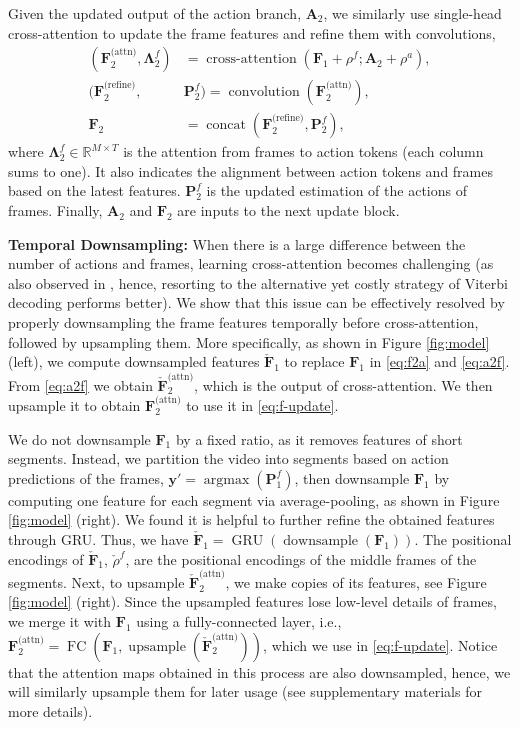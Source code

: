 \documentclass[10pt,twocolumn,letterpaper]{article}
\newcommand{\headline}[1]{\noindent \textbf{#1}}
\newcommand{\A}{\mathbf{A}}
\newcommand{\F}{\mathbf{F}}
\newcommand{\dF}{\check{\mathbf{F}}}
\newcommand{\Prob}{\mathbf{P}}
\newcommand{\y}{\boldsymbol{y}}
\newcommand{\attn}{\text{(attn)}}
\newcommand{\refine}{\text{(refine)}}
\renewcommand{\Re}{\mathbb{R}}
\newcommand{\0}{\boldsymbol{0}}
\newcommand{\conv}{\operatorname{convolution}}
\newcommand{\conc}{\operatorname{concat}}
\newcommand{\catt}{\operatorname{cross-attention}}
\newcommand{\amax}{\operatorname{argmax}}
\newcommand{\dsample}{\operatorname{downsample}}
\newcommand{\usample}{\operatorname{upsample}}
\newcommand{\gru}{\operatorname{GRU}}
\newcommand{\fc}{\operatorname{FC}}
\begin{document}
Given the updated output of the action branch, $\A_2$, we similarly use single-head cross-attention to update the frame features and refine them with convolutions, 
\begin{align}
(\F^\attn_2, \mathbf{\Lambda}^f_2) &= \catt(\F_1 + \rho^f; \A_2 + \rho^a), \label{eq:a2f} \\
(\F^\refine_2, & \Prob^f_2)  = \conv(\F^\attn_2), \\
\F_2 & =  \conc(\F^\refine_2, \Prob^f_2), \label{eq:f-update}
\end{align}
where $\mathbf{\Lambda}^f_2 \in \Re^{M \times T}$ is the attention from frames to action tokens (each column sums to one). It also indicates the alignment between action tokens and frames based on the latest features. 
$\Prob^f_2$ is the updated estimation of the actions of frames. 
Finally, $\A_2$ and $\F_2$ are inputs to the next update block.

\headline{Temporal Downsampling: } 
When there is a large difference between the number of actions and frames, learning cross-attention becomes challenging (as also observed in \cite{Behrmann:ECCV22}, hence, resorting to the alternative yet costly strategy of Viterbi decoding performs better). 
We show that this issue can be effectively resolved by properly downsampling the frame features temporally before cross-attention, followed by upsampling them. More specifically, as shown in Figure \ref{fig:model} (left), we compute downsampled features $\check{\F}_1$ to replace $\F_1$ in \eqref{eq:f2a} and \eqref{eq:a2f}.  
From \eqref{eq:a2f} we obtain $\dF^\attn_{2}$, which is the output of cross-attention. We then upsample it to obtain $\F^\attn_2$ to use it in \eqref{eq:f-update}.

We do not downsample $\F_1$ by a fixed ratio, as it removes features of short segments.
Instead, we partition the video into segments based on action predictions of the frames, $\y' = \amax(\Prob^f_1)$, then downsample $\F_1$ by computing one feature for each segment via average-pooling, as shown in Figure \ref{fig:model} (right).
We found it is helpful to further refine the obtained features through GRU. 
Thus, we have $\check{\F}_1 = \gru(\dsample(\F_1))$. The positional encodings of $\dF_1$, $\check{\rho}^f$, are the positional encodings of the middle frames of the segments.
Next, to upsample $\dF^\attn_{2}$, we make copies of its features, see Figure \ref{fig:model} (right). Since the upsampled features lose low-level details of frames, we merge it with $\F_1$ using a fully-connected layer, i.e., $\F^\attn_2 = \fc(\F_{1}, \usample(\dF^\attn_{2}))$, which we use in \eqref{eq:f-update}. 
Notice that the attention maps obtained in this process are also downsampled, hence, we will similarly upsample them for later usage (see supplementary materials for more details). 
\end{document}
